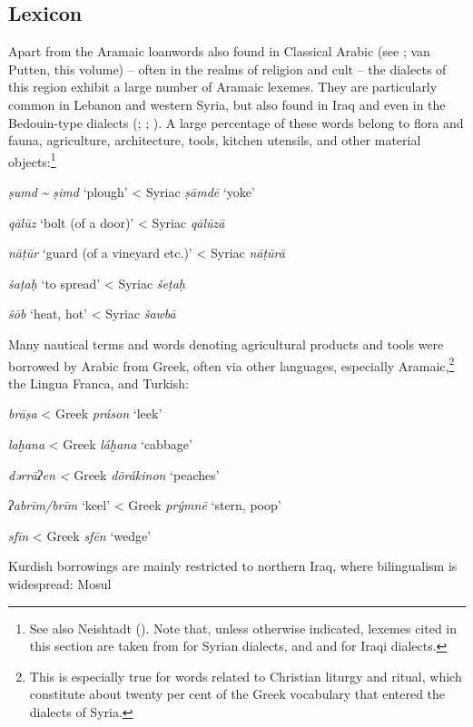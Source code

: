 \documentclass[output=paper]{langsci/langscibook}
\begin{document}
  \subsection{Lexicon} 
Apart from the Aramaic loanwords also found in Classical Arabic (see \citealt{Retsö2011}; van Putten, this volume) – often in the realms of religion and cult – the dialects of this region exhibit a large number of Aramaic lexemes. They are particularly common in Lebanon and western Syria, but also found in Iraq and even in the Bedouin-type dialects (\citealt{Féghali1918}; \citealt{Borg2004}; \citeyear{Borg2008}). A large percentage of these words belong to flora and fauna, agriculture, architecture, tools, kitchen utensils, and other material objects:\footnote{See also Neishtadt (\citeyear[282]{Neishtadt2015}). Note that, unless otherwise indicated, lexemes cited in this section are taken from \citet{Barthélemy1935} for Syrian dialects, and \citet{WoodheadEtAl1967} and \citet{alBakri1972} for Iraqi dialects.}

\ea
\textit{ṣumd} \textit{{\textasciitilde} ṣimd} ‘plough’ < Syriac \textit{ṣāmdē} ‘yoke’

\textit{qālūz} ‘bolt (of a door)’ < Syriac \textit{qālūzā}

\textit{nāṭūr} ‘guard (of a vineyard etc.)’ < Syriac \textit{nāṭūrā}

\textit{šaṭaḥ} ‘to spread’ < Syriac \textit{šeṭaḥ}

\textit{šōb} ‘heat, hot’ < Syriac \textit{šawbā}
\z

Many nautical terms and words denoting agricultural products and tools were borrowed by Arabic from Greek, often via other languages, especially Aramaic,\footnote{This is especially true for words related to Christian liturgy and ritual, which constitute about twenty per cent of the Greek vocabulary that entered the dialects of Syria.} the Lingua Franca, and Turkish: 

\ea
\textit{brāṣa} < Greek \textit{práson} ‘leek’ 

\textit{laḫana} < Greek \textit{láḫana} ‘cabbage’

\textit{dərrāʔen} \textit{<} Greek \textit{dōrákinon} ‘peaches’

\textit{ʔabrīm/brīm} ‘keel’ < Greek \textit{prýmnē} ‘stern, poop’

\textit{sfīn} < Greek \textit{sfēn} ‘wedge’
\z

Kurdish borrowings are mainly restricted to northern Iraq, where bilingualism is widespread: 
\ea
Mosul
\end{document}
